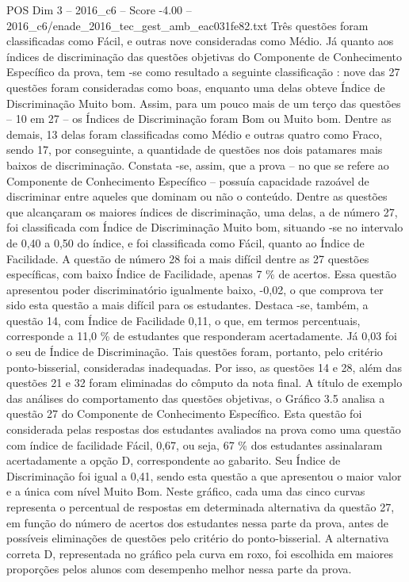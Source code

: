\begin{textsample}{POS Dim 3 – 2016\_c6 – Score -4.00 – 2016\_c6/enade\_2016\_tec\_gest\_amb\_eac031fe82.txt}
Três questões foram classificadas como Fácil, e outras nove consideradas como Médio.
Já quanto aos índices de discriminação das questões objetivas do Componente de Conhecimento Específico da prova, tem -se como resultado a seguinte classificação : nove das 27 questões foram consideradas como boas, enquanto uma delas obteve Índice de Discriminação Muito bom.
Assim, para um pouco mais de um terço das questões – 10 em 27 – os Índices de Discriminação foram Bom ou Muito bom.
Dentre as demais, 13 delas foram classificadas como Médio e outras quatro como Fraco, sendo 17, por conseguinte, a quantidade de questões nos dois patamares mais baixos de discriminação.
Constata -se, assim, que a prova – no que se refere ao Componente de Conhecimento Específico – possuía capacidade razoável de discriminar entre aqueles que dominam ou não o conteúdo.
Dentre as questões que alcançaram os maiores índices de discriminação, uma delas, a de número 27, foi classificada com Índice de Discriminação Muito bom, situando -se no intervalo de 0,40 a 0,50 do índice, e foi classificada como Fácil, quanto ao Índice de Facilidade.
A questão de número 28 foi a mais difícil dentre as 27 questões específicas, com baixo Índice de Facilidade, apenas 7 \% de acertos.
Essa questão apresentou poder discriminatório igualmente baixo, -0,02, o que comprova ter sido esta questão a mais difícil para os estudantes.
Destaca -se, também, a questão 14, com Índice de Facilidade 0,11, o que, em termos percentuais, corresponde a 11,0 \% de estudantes que responderam acertadamente.
Já 0,03 foi o seu de Índice de Discriminação.
Tais questões foram, portanto, pelo critério ponto-bisserial, consideradas inadequadas.
Por isso, as questões 14 e 28, além das questões 21 e 32 foram eliminadas do cômputo da nota final.
A título de exemplo das análises do comportamento das questões objetivas, o Gráfico 3.5 analisa a questão 27 do Componente de Conhecimento Específico.
Esta questão foi considerada pelas respostas dos estudantes avaliados na prova como uma questão com índice de facilidade Fácil, 0,67, ou seja, 67 \% dos estudantes assinalaram acertadamente a opção D, correspondente ao gabarito.
Seu Índice de Discriminação foi igual a 0,41, sendo esta questão a que apresentou o maior valor e a única com nível Muito Bom.
Neste gráfico, cada uma das cinco curvas representa o percentual de respostas em determinada alternativa da questão 27, em função do número de acertos dos estudantes nessa parte da prova, antes de possíveis eliminações de questões pelo critério do ponto-bisserial.
A alternativa correta D, representada no gráfico pela curva em roxo, foi escolhida em maiores proporções pelos alunos com desempenho melhor nessa parte da prova.

\end{textsample}
